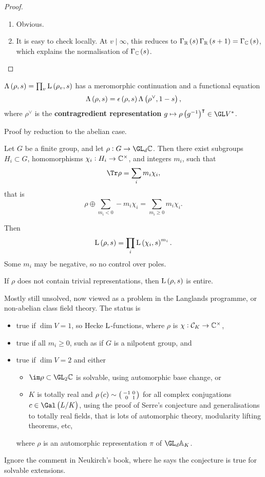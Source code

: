 \begin{proof}
\hfill
\begin{enumerate}
\item Obvious.
\item It is easy to check locally. At $ v \mid \infty $, this reduces to $ \Gamma_\RR\br{s}\Gamma_\RR\br{s + 1} = \Gamma_\CC\br{s} $, which explains the normalisation of $ \Gamma_\CC\br{s} $.
\end{enumerate}
\end{proof}

\begin{theorem}
$ \Lambda\br{\rho, s} = \prod_v \L\br{\rho_v, s} $ has a meromorphic continuation and a functional equation
$$ \Lambda\br{\rho, s} = \epsilon\br{\rho, s}\Lambda\br{\rho^\vee, 1 - s}, $$
where $ \rho^\vee $ is the \textbf{contragredient representation} $ g \mapsto \rho\br{g^{-1}}^\intercal \in \GL V^* $.
\end{theorem}

Proof by reduction to the abelian case.

\begin{theorem}[Brauer]
Let $ G $ be a finite group, and let $ \rho : G \to \GL_d \CC $. Then there exist subgroups $ H_i \subset G $, homomorphisms $ \chi_i : H_i \to \mathbb{C}^\times $, and integers $ m_i $, such that
$$ \Tr \rho = \sum_i m_i\chi_i, $$
that is
$$ \rho \oplus \sum_{m_i < 0} -m_i\chi_i = \sum_{m_i \ge 0} m_i\chi_i. $$
\end{theorem}

Then
$$ \L\br{\rho, s} = \prod_i \L\br{\chi_i, s}^{m_i}. $$
Some $ m_i $ may be negative, so no control over poles.

\begin{conjecture}
If $ \rho $ does not contain trivial representations, then $ \L\br{\rho, s} $ is entire.
\end{conjecture}

Mostly still unsolved, now viewed as a problem in the Langlands programme, or non-abelian class field theory. The status is
\begin{itemize}
\item true if $ \dim V = 1 $, so Hecke $ \mathrm{L} $-functions, where $ \rho $ is $ \chi : \mathcal{C}_K \to \mathbb{C}^\times $,
\item true if all $ m_i \ge 0 $, such as if $ G $ is a nilpotent group, and
\item true if $ \dim V = 2 $ and either
\begin{itemize}
\item $ \im \rho \subset \GL_2 \CC $ is solvable, using automorphic base change, or
\item $ K $ is totally real and $ \rho\br{c} \sim \twobytwosmall{-1}{0}{0}{1} $ for all complex conjugations $ c \in \Gal\br{L / K} $, using the proof of Serre's conjecture and generalisations to totally real fields, that is lots of automorphic theory, modularity lifting theorems, etc,
\end{itemize}
where $ \rho $ is an automorphic representation $ \pi $ of $ \GL_d \AA_K $.
\end{itemize}
Ignore the comment in Neukirch's book, where he says the conjecture is true for solvable extensions.

